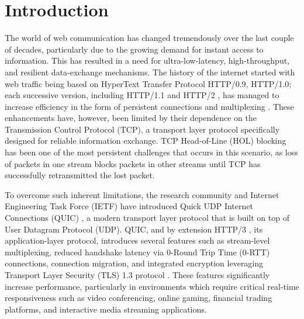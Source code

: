 




\chapter{Introduction}
\label{chap\:Introduction}

The world of web communication has changed tremendously over the last couple of decades, particularly due to the growing demand for instant access to information. This has resulted in a need for ultra-low-latency, high-throughput, and resilient data-exchange mechanisms. The history of the internet started with web traffic being based on HyperText Transfer Protocol HTTP/0.9, HTTP/1.0; each successive version, including HTTP/1.1 and HTTP/2 \cite{rfc7540}, has managed to increase efficiency in the form of persistent connections and multiplexing \cite{kurose2017}. These enhancements have, however, been limited by their dependence on the Transmission Control Protocol (TCP), a transport layer protocol specifically designed for reliable information exchange. TCP Head-of-Line (HOL) blocking has been one of the most persistent challenges that occurs in this scenario, as loss of packets in one stream blocks packets in other streams until TCP has successfully retransmitted the lost packet.

To overcome such inherent limitations, the research community and Internet Engineering Task Force (IETF) have introduced Quick UDP Internet Connections (QUIC) \cite{rfc9000}, a modern transport layer protocol that is built on top of User Datagram Protocol (UDP). QUIC, and by extension HTTP/3 \cite{rfc9114}, its application-layer protocol, introduces several features such as stream-level multiplexing, reduced handshake latency via 0-Round Trip Time (0-RTT) connections, connection migration, and integrated encryption leveraging Transport Layer Security (TLS) 1.3 protocol \cite{quic-performance-analysis}. These features significantly increase performance, particularly in environments which require critical real-time responsiveness such as video conferencing, online gaming, financial trading platforms, and interactive media streaming applications.


